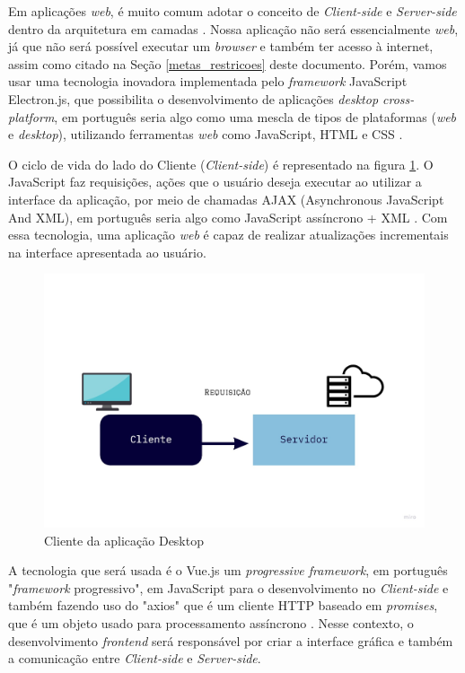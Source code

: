 Em aplicações \textit{web}, é muito comum adotar o conceito de \textit{Client-side} e \textit{Server-side} dentro da arquitetura em camadas \cite{ServerAndClient}. Nossa aplicação não será essencialmente \textit{web}, já que não será possível executar um \textit{browser} e também ter acesso à internet, assim como citado na Seção \ref{metas_restricoes} deste documento. Porém, vamos usar uma tecnologia inovadora implementada pelo \textit{framework} JavaScript Electron.js, que possibilita o desenvolvimento de aplicações \textit{desktop cross-platform}, em português seria algo como uma mescla de tipos de plataformas (\textit{web} e \textit{desktop}), utilizando ferramentas \textit{web} como JavaScript, HTML e CSS \cite{electron}.

O ciclo de vida do lado do Cliente (\textit{Client-side}) é representado na figura \ref{fig:client-side}. O JavaScript faz requisições, ações que o usuário deseja executar ao utilizar a interface da aplicação, por meio de chamadas AJAX (Asynchronous JavaScript And XML), em português seria algo como JavaScript assíncrono + XML \cite{Ajax}. Com essa tecnologia, uma aplicação \textit{web} é capaz de realizar atualizações incrementais na interface apresentada ao usuário.

\begin{figure}[!h]
	\centering
		\includegraphics[keepaspectratio=true,scale=0.3]{figuras/client.jpg}
	\caption{Cliente da aplicação Desktop}
	\label{fig:client-side}
\end{figure}


A tecnologia que será usada é o Vue.js um \textit{progressive framework}, em português "\textit{framework} progressivo", em JavaScript para o desenvolvimento no \textit{Client-side} \cite{Vue} e também fazendo uso do "axios" que é um cliente HTTP baseado em \textit{promises}, que é um objeto usado para processamento assíncrono \cite{Promise}. Nesse contexto, o desenvolvimento \textit{frontend} será responsável por criar a interface gráfica e também a comunicação entre \textit{Client-side} e \textit{Server-side}. 

